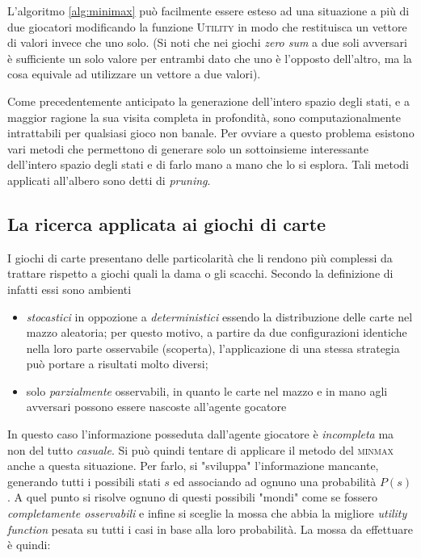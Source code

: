 L'algoritmo \ref{alg:minimax} può facilmente essere esteso ad una situazione a più di due giocatori modificando la funzione \textsc{Utility} in modo che restituisca un vettore di valori invece che uno solo.
(Si noti che nei giochi \emph{zero sum} a due soli avversari è sufficiente un solo valore per entrambi dato che uno è l'opposto dell'altro, ma la cosa equivale ad utilizzare un vettore a due valori).

Come precedentemente anticipato la generazione dell'intero spazio degli stati, e a maggior ragione la sua visita completa in profondità, sono computazionalmente intrattabili per qualsiasi gioco non banale.
Per ovviare a questo problema esistono vari metodi che permettono di generare solo un sottoinsieme interessante dell'intero spazio degli stati e di farlo mano a mano che lo si esplora. Tali metodi applicati all'albero sono detti di \emph{pruning}.

\subsection{La ricerca applicata ai giochi di carte}

I giochi di carte presentano delle particolarità che li rendono più complessi da trattare rispetto a giochi quali la dama o gli scacchi.
Secondo la definizione di \cite{randw} infatti essi sono ambienti
\begin{itemize}
   \item \emph{stocastici} in oppozione a \emph{deterministici} essendo la distribuzione delle carte nel mazzo aleatoria; per questo motivo, a partire da due configurazioni identiche nella loro parte osservabile (scoperta), l'applicazione di una stessa strategia può portare a risultati molto diversi;
   \item solo \emph{parzialmente} osservabili, in quanto le carte nel mazzo e in mano agli avversari possono essere nascoste all'agente gocatore
\end{itemize}
In questo caso l'informazione posseduta dall'agente giocatore è \emph{incompleta} ma non del tutto \emph{casuale}.
Si può quindi tentare di applicare il metodo del \textsc{minmax} anche a questa situazione.
Per farlo, si "sviluppa" l'informazione mancante, generando tutti i possibili stati $s$ ed associando ad ognuno una probabilità $P(s)$.
A quel punto si risolve ognuno di questi possibili "mondi" come se fossero \emph{completamente osservabili} e infine si sceglie la mossa che abbia la migliore \emph{utility function} pesata su tutti i casi in base alla loro probabilità.
La mossa da effettuare è quindi:

